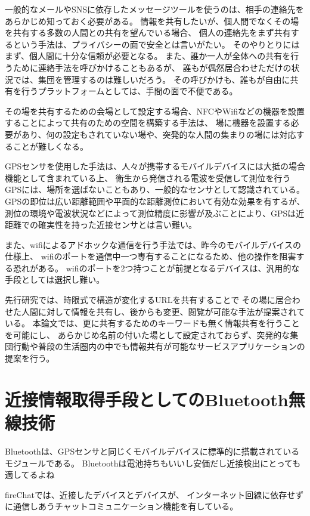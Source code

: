 一般的なメールやSNSに依存したメッセージツールを使うのは、相手の連絡先をあらかじめ知っておく必要がある。
情報を共有したいが、個人間でなくその場を共有する多数の人間との共有を望んでいる場合、
個人の連絡先をまず共有するという手法は、プライバシーの面で安全とは言いがたい。
そのやりとりにはまず、個人間に十分な信頼が必要となる。
また、誰か一人が全体への共有を行うために連絡手法を呼びかけることもあるが、
誰もが偶然居合わせただけの状況では、集団を管理するのは難しいだろう。
その呼びかけも、誰もが自由に共有を行うプラットフォームとしては、手間の面で不便である。

その場を共有するための会場として設定する場合、NFCやWifiなどの機器を設置することによって共有のための空間を構築する手法は、
場に機器を設置する必要があり、何の設定もされていない場や、突発的な人間の集まりの場には対応することが難しくなる。

GPSセンサを使用した手法は、人々が携帯するモバイルデバイスには大抵の場合機能として含まれている上、
衛生から発信される電波を受信して測位を行うGPSには、場所を選ばないこともあり、一般的なセンサとして認識されている。
GPSの即位は広い距離範囲や平面的な距離測位において有効な効果を有するが、
測位の環境や電波状況などによって測位精度に影響が及ぶことにより、GPSは近距離での確実性を持った近接センサとは言い難い。

また、wifiによるアドホックな通信を行う手法では、昨今のモバイルデバイスの仕様上、
wifiのポートを通信中一つ専有することになるため、他の操作を阻害する恐れがある。
wifiのポートを2つ持つことが前提となるデバイスは、汎用的な手段としては選択し難い。

先行研究\cite{山本伶:2013-03-06}では、時限式で構造が変化するURLを共有することで
その場に居合わせた人間に対して情報を共有し、後からも変更、閲覧が可能な手法が提案されている。
本論文では、更に共有するためのキーワードも無く情報共有を行うことを可能にし、
あらかじめ名前の付いた場として設定されておらず、突発的な集団行動や普段の生活圏内の中でも情報共有が可能なサービスアプリケーションの提案を行う。


\section{近接情報取得手段としてのBluetooth無線技術}

Bluetooth\cite{bluetooth}は、GPSセンサと同じくモバイルデバイスに標準的に搭載されているモジュールである。
Bluetoothは電池持ちもいいし安価だし近接検出にとっても適してるよね

fireChat\cite{firechat}では、近接したデバイスとデバイスが、
インターネット回線に依存せずに通信しあうチャットコミュニケーション機能を有している。

